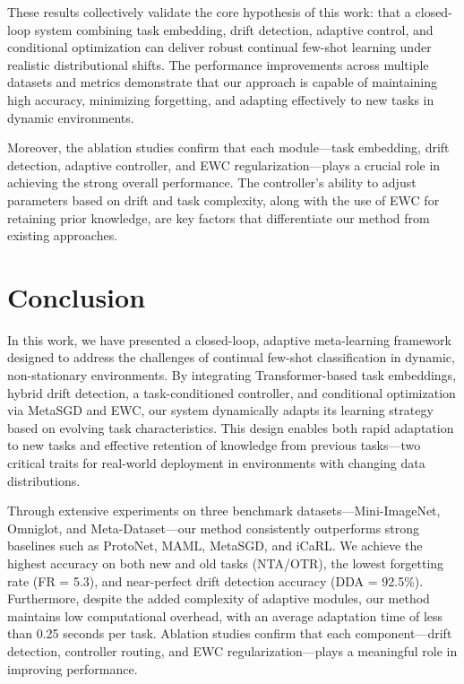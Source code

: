 \documentclass[conference]{IEEEtran}
\begin{document}
These results collectively validate the core hypothesis of this work: that a closed-loop system combining task embedding, drift detection, adaptive control, and conditional optimization can deliver robust continual few-shot learning under realistic distributional shifts. The performance improvements across multiple datasets and metrics demonstrate that our approach is capable of maintaining high accuracy, minimizing forgetting, and adapting effectively to new tasks in dynamic environments.

Moreover, the ablation studies confirm that each module—task embedding, drift detection, adaptive controller, and EWC regularization—plays a crucial role in achieving the strong overall performance. The controller's ability to adjust parameters based on drift and task complexity, along with the use of EWC for retaining prior knowledge, are key factors that differentiate our method from existing approaches.

\section{Conclusion}

In this work, we have presented a closed-loop, adaptive meta-learning framework designed to address the challenges of continual few-shot classification in dynamic, non-stationary environments. By integrating Transformer-based task embeddings, hybrid drift detection, a task-conditioned controller, and conditional optimization via MetaSGD and EWC, our system dynamically adapts its learning strategy based on evolving task characteristics. This design enables both rapid adaptation to new tasks and effective retention of knowledge from previous tasks—two critical traits for real-world deployment in environments with changing data distributions.

Through extensive experiments on three benchmark datasets—Mini-ImageNet, Omniglot, and Meta-Dataset—our method consistently outperforms strong baselines such as ProtoNet, MAML, MetaSGD, and iCaRL. We achieve the highest accuracy on both new and old tasks (NTA/OTR), the lowest forgetting rate (FR = 5.3), and near-perfect drift detection accuracy (DDA = 92.5\%). Furthermore, despite the added complexity of adaptive modules, our method maintains low computational overhead, with an average adaptation time of less than 0.25 seconds per task. Ablation studies confirm that each component—drift detection, controller routing, and EWC regularization—plays a meaningful role in improving performance.
\end{document}
